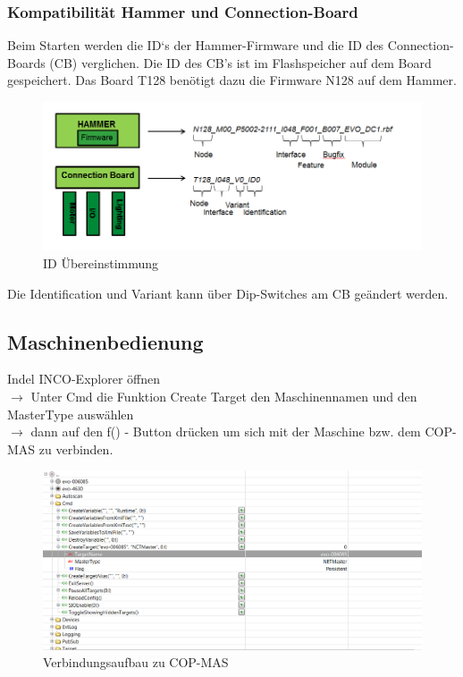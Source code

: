 		\subsubsection{Kompatibilität Hammer und Connection-Board}
			Beim Starten werden die ID`s der Hammer-Firmware und die ID des Connection-Boards (CB) verglichen. Die ID des CB's ist im Flashspeicher auf dem Board gespeichert. Das Board T128 benötigt dazu die Firmware N128 auf dem Hammer. 
			\begin{figure}[h!]
				\centering
				\includegraphics[width=0.8\linewidth]{./pics/ccp/connectionboard.png}
				\caption{ID Übereinstimmung}
			\end{figure}
			Die Identification und Variant kann über Dip-Switches am CB geändert werden. 
		
	\subsection{Maschinenbedienung}
		Indel INCO-Explorer öffnen \\
		$ \rightarrow $ Unter Cmd die Funktion Create Target den Maschinennamen und den MasterType auswählen\\ 
		$ \rightarrow $ dann auf den f() - Button drücken um sich mit der Maschine bzw. dem COP-MAS zu verbinden.
		\begin{figure}[h!]
			\centering
			\includegraphics[width=\linewidth]{./pics/ccp/connect.png}
			\caption{Verbindungsaufbau zu COP-MAS}
		\end{figure}
